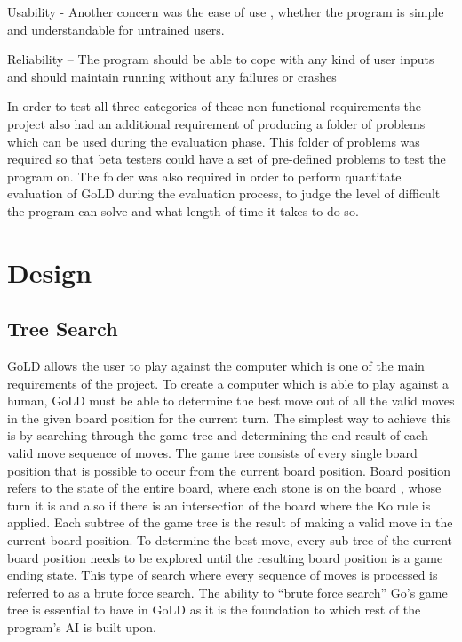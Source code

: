 \documentclass{l4proj}
\begin{document}
Usability - Another concern was the ease of use , whether the program is simple and understandable for untrained users.

Reliability – The program should be able to cope with any kind of user inputs and should maintain running without any failures or crashes

In order to test all three categories of these non-functional requirements the project also had an additional requirement of producing a folder of problems which can be used during the evaluation phase. This folder of problems was required so that beta testers could have a set of pre-defined problems to test the program on. The folder was also required in order to perform quantitate evaluation of GoLD during the evaluation process, to judge the level of difficult the program can solve and what length of time it takes to do so.





\chapter{Design}


\section{Tree Search}
GoLD allows the user to play against the computer which is one of the main requirements of the project. To create a computer which is able to play against a human, GoLD must be able to determine the best move out of all the valid moves in the given board position for the current turn. The simplest way to achieve this is by searching through the game tree and determining the end result of each valid move sequence of moves. The game tree consists of every single board position that is possible to occur from the current board position. Board position refers to the state of the entire board, where each stone is on the board , whose turn it is and also if there is an intersection of the board where the Ko rule is applied. Each subtree of the game tree is the result of making a valid move in the current board position. To determine the best move, every sub tree of the current board position needs to be explored until the resulting board position is a game ending state. This type of search where every sequence of moves is processed is referred to as a brute force search. The ability to “brute force search” Go’s game tree is essential to have in GoLD as it is the foundation to which rest of the program’s AI is built upon.
\end{document}
